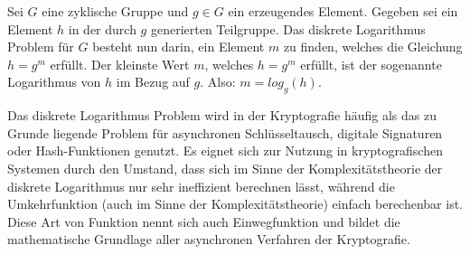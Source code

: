 Sei $ G $ eine zyklische Gruppe und $ g \in G $ ein erzeugendes Element. Gegeben sei ein Element $h$ in der durch $g$ generierten Teilgruppe.
Das diskrete Logarithmus Problem für $G$ besteht nun darin, ein Element $m$ zu finden, welches die Gleichung $ h = g^m $ erfüllt.
Der kleinste Wert $m$, welches $h = g^m$ erfüllt, ist der sogenannte Logarithmus von $h$ im Bezug auf $g$. Also: $m = log_g(h)$.

Das diskrete Logarithmus Problem wird in der Kryptografie häufig als das zu Grunde liegende Problem für asynchronen Schlüsseltausch, digitale Signaturen oder Hash-Funktionen genutzt. Es eignet sich zur Nutzung in kryptografischen
Systemen durch den Umstand, dass sich im Sinne der Komplexitätstheorie der diskrete Logarithmus nur sehr ineffizient
berechnen lässt, während die Umkehrfunktion (auch im Sinne der Komplexitätstheorie) einfach berechenbar ist.
Diese Art von Funktion nennt sich auch Einwegfunktion und bildet die mathematische Grundlage aller asynchronen 
Verfahren der Kryptografie.	

